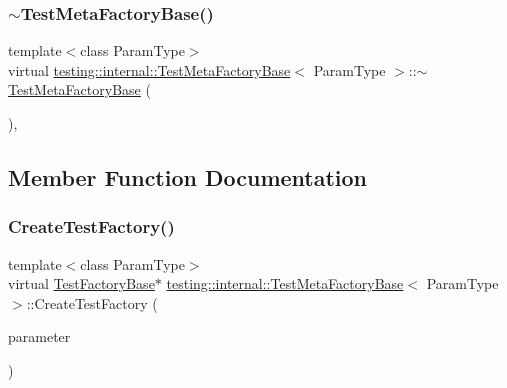 \subsubsection{\texorpdfstring{$\sim$TestMetaFactoryBase()}{~TestMetaFactoryBase()}\hspace{0.1cm}{\footnotesize\ttfamily [3/3]}}
{\footnotesize\ttfamily template$<$class Param\+Type$>$ \\
virtual \mbox{\hyperlink{classtesting_1_1internal_1_1_test_meta_factory_base}{testing\+::internal\+::\+Test\+Meta\+Factory\+Base}}$<$ Param\+Type $>$\+::$\sim$\mbox{\hyperlink{classtesting_1_1internal_1_1_test_meta_factory_base}{Test\+Meta\+Factory\+Base}} (\begin{DoxyParamCaption}{ }\end{DoxyParamCaption})\hspace{0.3cm}{\ttfamily [inline]}, {\ttfamily [virtual]}}



\subsection{Member Function Documentation}
\mbox{\label{classtesting_1_1internal_1_1_test_meta_factory_base_a853daab362740bcac55e180128d564ef}} 
\subsubsection{\texorpdfstring{CreateTestFactory()}{CreateTestFactory()}\hspace{0.1cm}{\footnotesize\ttfamily [1/3]}}
{\footnotesize\ttfamily template$<$class Param\+Type$>$ \\
virtual \mbox{\hyperlink{classtesting_1_1internal_1_1_test_factory_base}{Test\+Factory\+Base}}$\ast$ \mbox{\hyperlink{classtesting_1_1internal_1_1_test_meta_factory_base}{testing\+::internal\+::\+Test\+Meta\+Factory\+Base}}$<$ Param\+Type $>$\+::Create\+Test\+Factory (\begin{DoxyParamCaption}\item[{Param\+Type}]{parameter }\end{DoxyParamCaption})\hspace{0.3cm}{\ttfamily [pure virtual]}}

